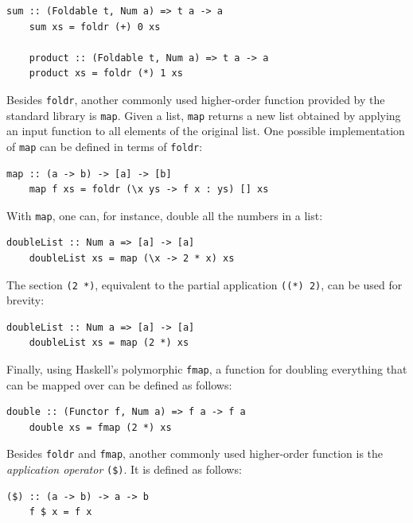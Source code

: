 \documentclass[UdineBachThesis,american,11pt]{PhdThesis}
\begin{document}
  \begin{Verbatim}[gobble=4,fontsize=\small]
    sum :: (Foldable t, Num a) => t a -> a
    sum xs = foldr (+) 0 xs

    product :: (Foldable t, Num a) => t a -> a
    product xs = foldr (*) 1 xs
  \end{Verbatim}

  Besides \mbox{\texttt{foldr}}, another commonly used higher-order function
  provided by the standard library is \mbox{\texttt{map}}. Given a list,
  \mbox{\texttt{map}} returns a new list obtained by applying an input function
  to all elements of the original list. One possible implementation of
  \mbox{\texttt{map}} can be defined in terms of \mbox{\texttt{foldr}}:

  \begin{Verbatim}[gobble=4,fontsize=\small]
    map :: (a -> b) -> [a] -> [b]
    map f xs = foldr (\x ys -> f x : ys) [] xs
  \end{Verbatim}

  With \mbox{\texttt{map}}, one can, for instance, double all the numbers in a
  list:

  \begin{Verbatim}[gobble=4,fontsize=\small]
    doubleList :: Num a => [a] -> [a]
    doubleList xs = map (\x -> 2 * x) xs
  \end{Verbatim}

  The section \mbox{\texttt{(2 *)}}, equivalent to the partial application
  \mbox{\texttt{((*) 2)}}, can be used for brevity:

  \begin{Verbatim}[gobble=4,fontsize=\small]
    doubleList :: Num a => [a] -> [a]
    doubleList xs = map (2 *) xs
  \end{Verbatim}

  Finally, using Haskell's polymorphic \mbox{\texttt{fmap}}, a function for
  doubling everything that can be mapped over can be defined as follows:

  \begin{Verbatim}[gobble=4,fontsize=\small]
    double :: (Functor f, Num a) => f a -> f a
    double xs = fmap (2 *) xs
  \end{Verbatim}

  Besides \mbox{\texttt{foldr}} and \mbox{\texttt{fmap}}, another commonly used
  higher-order function is the \emph{application operator} \mbox{\texttt{(\$)}}.
  It is defined as follows:

  \begin{Verbatim}[gobble=4,fontsize=\small]
    ($) :: (a -> b) -> a -> b
    f $ x = f x
  \end{Verbatim}
\end{document}
